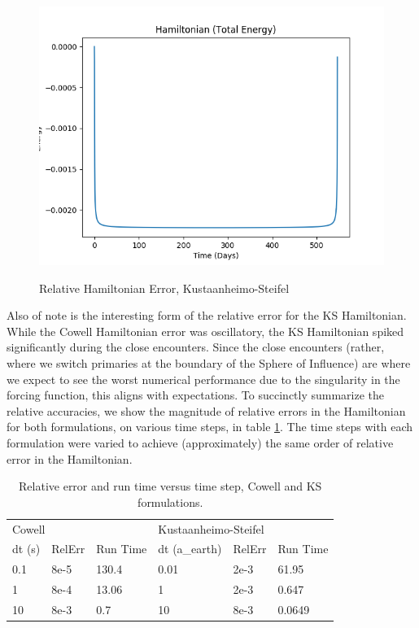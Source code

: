 \documentclass[11pt,twoside,letterpaper]{article}
\begin{document}
  \begin{figure}
    \caption{Relative Hamiltonian Error, Kustaanheimo-Steifel}
    \centering
    \includegraphics[width=\textwidth]{HamiltonianKS}
    \label{ksham}
  \end{figure}
  
  Also of note is the interesting form of the relative error for the
  KS Hamiltonian. While the Cowell Hamiltonian error was oscillatory,
  the KS Hamiltonian spiked significantly during the close
  encounters. Since the close encounters (rather, where we switch
  primaries at the boundary of the Sphere of Influence) are where we
  expect to see the worst numerical performance due to the singularity
  in the forcing function, this aligns with expectations. To
  succinctly summarize the relative accuracies, we show the magnitude
  of relative errors in the Hamiltonian for both formulations, on
  various time steps, in table \ref{resultsTab}. The time steps with
  each formulation were varied to achieve (approximately) the same
  order of relative error in the Hamiltonian. 

  \begin{table}[] \label{resultsTab}
    \centering
    \begin{tabular}{llllll}
      \multicolumn{3}{l}{Cowell} & \multicolumn{3}{l}{Kustaanheimo-Steifel} \\
      dt (s) & RelErr & Run Time & dt (a\_earth) & RelErr & Run Time \\ \hline
      \multicolumn{1}{|l|}{0.1} & \multicolumn{1}{l|}{8e-5} & \multicolumn{1}{l|}{130.4} & \multicolumn{1}{l|}{0.01} & \multicolumn{1}{l|}{2e-3} & \multicolumn{1}{l|}{61.95} \\ \hline
      \multicolumn{1}{|l|}{1} & \multicolumn{1}{l|}{8e-4} & \multicolumn{1}{l|}{13.06} & \multicolumn{1}{l|}{1} & \multicolumn{1}{l|}{2e-3} & \multicolumn{1}{l|}{0.647} \\ \hline
      \multicolumn{1}{|l|}{10} & \multicolumn{1}{l|}{8e-3} & \multicolumn{1}{l|}{0.7} & \multicolumn{1}{l|}{10} & \multicolumn{1}{l|}{8e-3} & \multicolumn{1}{l|}{0.0649} \\ \hline
    \end{tabular}
    \caption{Relative error and run time versus time step, Cowell and KS formulations.}
  \end{table}
  
\end{document}
